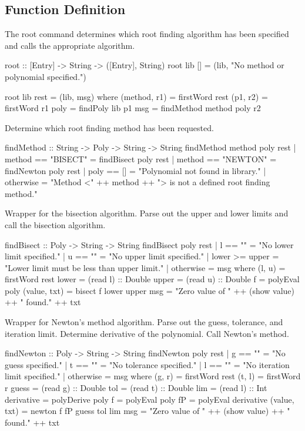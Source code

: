 \subsection{Function Definition}
The root command determines which root finding algorithm has been specified and calls the appropriate algorithm.
\begin{code}
root :: [Entry] -> String -> ([Entry], String)
root lib [] = (lib, "No method or polynomial specified.")

root lib rest = (lib, msg)
  where
    (method, r1) = firstWord rest
    (p1, r2) = firstWord r1
    poly = findPoly lib p1
    msg = findMethod method poly r2
\end{code}
Determine which root finding method has been requested.
\begin{code}
    findMethod :: String -> Poly -> String -> String
    findMethod method poly rest
      | method == "BISECT" = findBisect poly rest
      | method == "NEWTON" = findNewton poly rest
      | poly == []         = "Polynomial not found in library."
      | otherwise          = "Method <" ++ method ++ "> is not a defined root finding method."
\end{code}
Wrapper for the bisection algorithm.  Parse out the upper and lower limits and call the bisection algorithm.
\begin{code}
    findBisect :: Poly -> String -> String
    findBisect poly rest
      | l == "" = "No lower limit specified."
      | u == "" = "No upper limit specified."
      | lower >= upper = "Lower limit must be less than upper limit."
      | otherwise = msg
      where
        (l, u) = firstWord rest
        lower = (read l) :: Double
        upper = (read u) :: Double
        f = polyEval poly
        (value, txt) = bisect f lower upper
        msg = "Zero value of " ++ (show value) ++ " found.\n" ++ txt
\end{code}
Wrapper for Newton's method algorithm.  Parse out the guess, tolerance, and iteration limit.  Determine derivative of the polynomial.  Call Newton's method.
\begin{code}
    findNewton :: Poly -> String -> String
    findNewton poly rest
      | g == "" = "No guess specified."
      | t == "" = "No tolerance specified."
      | l == "" = "No iteration limit specified."
      | otherwise = msg
      where
        (g, r) = firstWord rest
        (t, l) = firstWord r
        guess = (read g) :: Double
        tol = (read t) :: Double
        lim = (read l) :: Int
        derivative = polyDerive poly
        f = polyEval poly
        fP = polyEval derivative
        (value, txt) = newton f fP guess tol lim
        msg = "Zero value of " ++ (show value) ++ " found.\n" ++ txt
\end{code}

